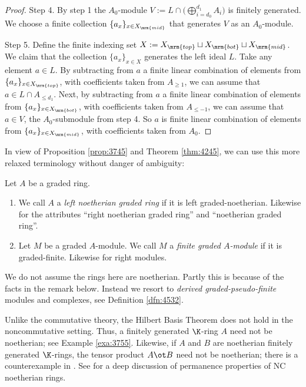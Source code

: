 \begin{proof}
\medskip \noindent
Step 4. By step 1 the $A_0$-module
$V := L \cap \bigl( \bigoplus\nolimits_{i = d_0}^{d_1} A_i \bigr)$
is finitely generated. We choose a finite collection 
 $\{ a_x \}_{x \in X_{\mrm{mid}}}$ 
that generates $V$ as an $A_0$-module.

\medskip \noindent
Step 5. Define the finite indexing set  
$X := X_{\mrm{top}} \sqcup X_{\mrm{bot}} \sqcup X_{\mrm{mid}}$.
We claim that the collection $\{ a_x \}_{x \in X}$ 
generates the left ideal $L$. Take any element $a \in L$. 
By subtracting from $a$ a finite linear combination of elements 
from $\{ a_x \}_{x \in X_{\mrm{top}}}$, with coefficients taken from 
$A_{\geq 1}$, we can assume that 
$a \in L \cap A_{\leq d_1}$. 
Next, by subtracting from $a$ a finite linear combination of elements 
from $\{ a_x \}_{x \in X_{\mrm{bot}}}$, with coefficients taken from 
$A_{\leq -1}$, we can assume that $a \in V$, the $A_0$-submodule from step 4.
So $a$ is finite linear combination of elements 
from $\{ a_x \}_{x \in X_{\mrm{mid}}}$, with coefficients taken from $A_0$. 
\end{proof}

In view of Proposition \ref{prop:3745} and Theorem \ref{thm:4245}, we can use 
this more relaxed terminology without danger of ambiguity: 

\begin{dfn} \label{dfn:4262}
Let $A$ be a graded ring. 
\begin{enumerate}
\item We call $A$ a {\em left noetherian graded ring} 
if it is left graded-noetherian. Likewise for the attributes ``right noetherian 
graded ring'' and  ``noetherian graded ring''. 

\item Let $M$ be a graded $A$-module. We call $M$ a 
{\em finite graded $A$-module}
if it is graded-finite. Likewise for right modules. 
\end{enumerate}
\end{dfn}

We do not assume the rings here are noetherian. Partly this is because of the 
facts in the remark below. Instead we resort to {\em derived 
graded-pseudo-finite} modules and complexes, see Definition \ref{dfn:4532}. 

\begin{rem} \label{rem:3901}
Unlike the commutative theory, the Hilbert Basis Theorem does not hold in the 
noncommutative setting. Thus, a finitely generated $\K$-ring $A$ need 
not be noetherian; see Example \ref{exa:3755}. Likewise, if $A$ and $B$ are 
noetherian finitely generated $\K$-rings, the tensor product $A \ot B$ need not 
be noetherian; there is a counterexample in \cite{Rog}. 
See \cite{ArSmZh} for a deep discussion of permanence properties 
of NC noetherian rings. 
\end{rem}


